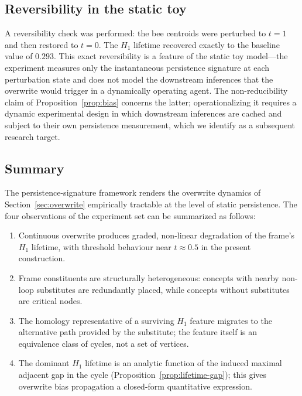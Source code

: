 \documentclass[12pt]{article}
\begin{document}
\subsection*{Reversibility in the static toy}

A reversibility check was performed: the bee centroids were
perturbed to $t = 1$ and then restored to $t = 0$. The $H_1$
lifetime recovered exactly to the baseline value of $0.293$. This
exact reversibility is a feature of the static toy model---the
experiment measures only the instantaneous persistence signature
at each perturbation state and does not model the downstream
inferences that the overwrite would trigger in a dynamically
operating agent. The non-reducibility claim of
Proposition~\ref{prop:bias} concerns the latter; operationalizing
it requires a dynamic experimental design in which downstream
inferences are cached and subject to their own persistence
measurement, which we identify as a subsequent research target.

\subsection*{Summary}

The persistence-signature framework renders the overwrite dynamics
of Section~\ref{sec:overwrite} empirically tractable at the level
of static persistence. The four observations of the experiment set
can be summarized as follows:

\begin{enumerate}[noitemsep]
\item Continuous overwrite produces graded, non-linear degradation
  of the frame's $H_1$ lifetime, with threshold behaviour near
  $t \approx 0.5$ in the present construction.
\item Frame constituents are structurally heterogeneous: concepts
  with nearby non-loop substitutes are redundantly placed, while
  concepts without substitutes are critical nodes.
\item The homology representative of a surviving $H_1$ feature
  migrates to the alternative path provided by the substitute; the
  feature itself is an equivalence class of cycles, not a set of
  vertices.
\item The dominant $H_1$ lifetime is an analytic function of the
  induced maximal adjacent gap in the cycle
  (Proposition~\ref{prop:lifetime-gap}); this gives overwrite bias
  propagation a closed-form quantitative expression.
\end{enumerate}
\end{document}
